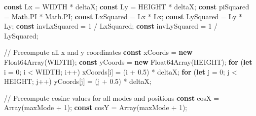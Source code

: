 \documentclass[
  letterpaper,
  DIV=11,
  numbers=noendperiod]{scrreprt}
\newenvironment{Shaded}{\begin{snugshade}}{\end{snugshade}}
\newcommand{\BuiltInTok}[1]{\textcolor[rgb]{0.00,0.23,0.31}{#1}}
\newcommand{\CommentTok}[1]{\textcolor[rgb]{0.37,0.37,0.37}{#1}}
\newcommand{\ConstantTok}[1]{\textcolor[rgb]{0.56,0.35,0.01}{#1}}
\newcommand{\ControlFlowTok}[1]{\textcolor[rgb]{0.00,0.23,0.31}{\textbf{#1}}}
\newcommand{\DecValTok}[1]{\textcolor[rgb]{0.68,0.00,0.00}{#1}}
\newcommand{\FloatTok}[1]{\textcolor[rgb]{0.68,0.00,0.00}{#1}}
\newcommand{\KeywordTok}[1]{\textcolor[rgb]{0.00,0.23,0.31}{\textbf{#1}}}
\newcommand{\NormalTok}[1]{\textcolor[rgb]{0.00,0.23,0.31}{#1}}
\newcommand{\OperatorTok}[1]{\textcolor[rgb]{0.37,0.37,0.37}{#1}}
\begin{document}
\begin{Shaded}
\begin{Highlighting}[]
    \KeywordTok{const}\NormalTok{ Lx }\OperatorTok{=}\NormalTok{ WIDTH }\OperatorTok{*}\NormalTok{ deltaX}\OperatorTok{;}
    \KeywordTok{const}\NormalTok{ Ly }\OperatorTok{=}\NormalTok{ HEIGHT }\OperatorTok{*}\NormalTok{ deltaX}\OperatorTok{;}
    \KeywordTok{const}\NormalTok{ piSquared }\OperatorTok{=} \BuiltInTok{Math}\OperatorTok{.}\ConstantTok{PI} \OperatorTok{*} \BuiltInTok{Math}\OperatorTok{.}\ConstantTok{PI}\OperatorTok{;}
    \KeywordTok{const}\NormalTok{ LxSquared }\OperatorTok{=}\NormalTok{ Lx }\OperatorTok{*}\NormalTok{ Lx}\OperatorTok{;}
    \KeywordTok{const}\NormalTok{ LySquared }\OperatorTok{=}\NormalTok{ Ly }\OperatorTok{*}\NormalTok{ Ly}\OperatorTok{;}
    \KeywordTok{const}\NormalTok{ invLxSquared }\OperatorTok{=} \DecValTok{1} \OperatorTok{/}\NormalTok{ LxSquared}\OperatorTok{;}
    \KeywordTok{const}\NormalTok{ invLySquared }\OperatorTok{=} \DecValTok{1} \OperatorTok{/}\NormalTok{ LySquared}\OperatorTok{;}

    \CommentTok{// Precompute all x and y coordinates}
    \KeywordTok{const}\NormalTok{ xCoords }\OperatorTok{=} \KeywordTok{new} \BuiltInTok{Float64Array}\NormalTok{(WIDTH)}\OperatorTok{;}
    \KeywordTok{const}\NormalTok{ yCoords }\OperatorTok{=} \KeywordTok{new} \BuiltInTok{Float64Array}\NormalTok{(HEIGHT)}\OperatorTok{;}
    \ControlFlowTok{for}\NormalTok{ (}\KeywordTok{let}\NormalTok{ i }\OperatorTok{=} \DecValTok{0}\OperatorTok{;}\NormalTok{ i }\OperatorTok{\textless{}}\NormalTok{ WIDTH}\OperatorTok{;}\NormalTok{ i}\OperatorTok{++}\NormalTok{) xCoords[i] }\OperatorTok{=}\NormalTok{ (i }\OperatorTok{+} \FloatTok{0.5}\NormalTok{) }\OperatorTok{*}\NormalTok{ deltaX}\OperatorTok{;}
    \ControlFlowTok{for}\NormalTok{ (}\KeywordTok{let}\NormalTok{ j }\OperatorTok{=} \DecValTok{0}\OperatorTok{;}\NormalTok{ j }\OperatorTok{\textless{}}\NormalTok{ HEIGHT}\OperatorTok{;}\NormalTok{ j}\OperatorTok{++}\NormalTok{) yCoords[j] }\OperatorTok{=}\NormalTok{ (j }\OperatorTok{+} \FloatTok{0.5}\NormalTok{) }\OperatorTok{*}\NormalTok{ deltaX}\OperatorTok{;}

    \CommentTok{// Precompute cosine values for all modes and positions}
    \KeywordTok{const}\NormalTok{ cosX }\OperatorTok{=} \BuiltInTok{Array}\NormalTok{(maxMode }\OperatorTok{+} \DecValTok{1}\NormalTok{)}\OperatorTok{;}
    \KeywordTok{const}\NormalTok{ cosY }\OperatorTok{=} \BuiltInTok{Array}\NormalTok{(maxMode }\OperatorTok{+} \DecValTok{1}\NormalTok{)}\OperatorTok{;}


\end{Highlighting}
\end{Shaded}
\end{document}
